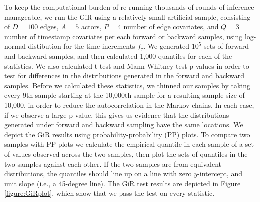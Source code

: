 \documentclass[ba]{imsart}
\numberwithin{equation}{section}
\theoremstyle{plain}
\begin{document}
   To keep the computational burden of re-running thousands of rounds of inference manageable, we run the GiR using a relatively small artificial sample, consisting of $D=100$ edges, $A=5$ actors, $P=4$ number of edge covariates, and $Q=3$ number of timestamp covariates per each forward or backward samples, using log-normal distibution for the time increments $f_\tau$. We generated $10^5$ sets of forward and backward samples, and then calculated 1,000 quantiles for each of the statistics. We also calculated t-test and Mann-Whitney test p-values in order to test for differences in the distributions generated in the forward and backward samples. Before we calculated these statistics, we thinned our samples by taking every 9th sample starting at the 10,000th sample for a resulting sample size of 10,000, in order to reduce the autocorrelation in the Markov chains. In each case, if we observe a large p-value, this gives us evidence that the distributions generated under forward and backward sampling have the same locations. We depict the GiR results using probability-probability (PP) plots. To compare two samples with PP plots we calculate the empirical quantile in each sample of a set of values observed across the two samples, then plot the sets of quantiles in the two samples against each other. If the two samples are from equivalent distributions, the quantiles should line up on a line with zero $y$-intercept, and unit slope (i.e., a 45-degree line). The GiR test results are depicted in Figure \ref{figure:GiRplot}, which show that we pass the test on every statistic.
\end{document}
